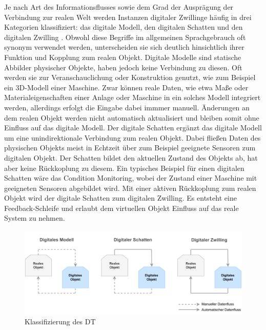 Je nach Art des Informationsflusses sowie dem Grad der Ausprägung der Verbindung zur realen Welt werden Instanzen digitaler Zwillinge häufig in drei Kategorien klassifiziert: das digitale Modell, den digitalen Schatten und den digitalen Zwilling \cite{ClassificationDT}.
Obwohl diese Begriffe im allgemeinen Sprachgebrauch oft synonym verwendet werden, unterscheiden sie sich deutlich hinsichtlich ihrer Funktion und Kopplung zum realen Objekt.
Digitale Modelle sind statische Abbilder physischer Objekte, haben jedoch keine Verbindung zu diesen. 
Oft werden sie zur Veranschauclichung oder Konstruktion genutzt, wie zum Beispiel ein 3D-Modell einer Maschine.
Zwar können reale Daten, wie etwa Maße oder Materialeigenschaften einer Anlage oder Maschine in ein solches Modell integriert werden, allerdings erfolgt die Eingabe dabei immmer manuell.
Änderungen an dem realen Objekt werden nicht automatisch aktualisiert und bleiben somit ohne Einfluss auf das digitale Modell.
Der digitale Schatten ergänzt das digitale Modell um eine unindirektionale Verbindung zum realen Objekt.
Dabei fließen Daten des physischen Objekts meist in Echtzeit über zum Beispiel geeignete Sensoren zum digitalen Objekt.
Der Schatten bildet den aktuellen Zustand des Objekts ab, hat aber keine Rückkoplung zu diesem.
Ein typisches Beispiel für einen digitalen Schatten wäre das Condition Monitoring, wobei der Zustand einer Maschine mit geeigneten Sensoren abgebildet wird.
Mit einer aktiven Rückkoplung zum realen Objekt wird der digitale Schatten zum digitalen Zwilling.
Es entsteht eine Feedback-Schleife und erlaubt dem virtuellen Objekt Einfluss auf das reale System zu nehmen.


\begin{figure}[htbp]
    \centering
    \includegraphics[width=1\textwidth]{Bilder/klassifizierung_DT.pdf}
    \caption{Klassifizierung des DT}
    \label{fig:klassifizierungDT}
\end{figure}

